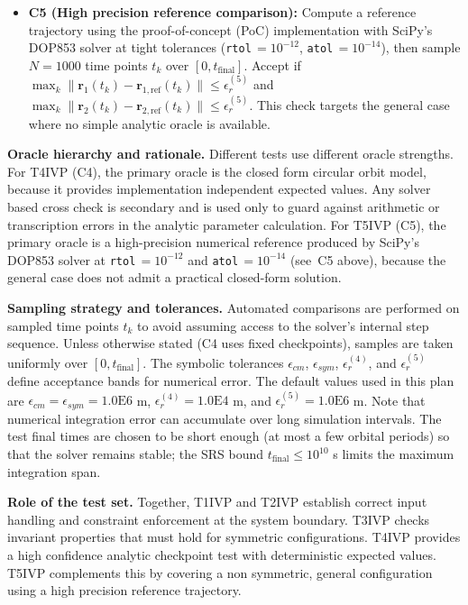 \documentclass[12pt, titlepage]{article}
\begin{document}
\begin{itemize}
  \item \textbf{C5 (High precision reference comparison):} Compute a reference
  trajectory using the proof-of-concept (PoC) implementation with SciPy's
  DOP853 solver at tight tolerances (\texttt{rtol}$\,=10^{-12}$,
  \texttt{atol}$\,=10^{-14}$), then sample $N=1000$ time points $t_k$ over
  $[0, t_{\text{final}}]$. Accept if
  $\max_k \lVert \mathbf{r}_1(t_k)-\mathbf{r}_{1,\text{ref}}(t_k)\rVert \le \epsilon_r^{(5)}$
  and
  $\max_k \lVert \mathbf{r}_2(t_k)-\mathbf{r}_{2,\text{ref}}(t_k)\rVert \le \epsilon_r^{(5)}$.
  This check targets the general case where no simple analytic oracle is
  available.
\end{itemize}

\textbf{Oracle hierarchy and rationale.}
Different tests use different oracle strengths. For T4IVP (C4), the primary
oracle is the closed form circular orbit model, because it provides
implementation independent expected values. Any solver based cross check is
secondary and is used only to guard against arithmetic or transcription errors
in the analytic parameter calculation. For T5IVP (C5), the primary oracle is a
high-precision numerical reference produced by SciPy's DOP853 solver at
\texttt{rtol}$\,=10^{-12}$ and \texttt{atol}$\,=10^{-14}$ (see~C5 above),
because the general case does not admit a practical closed-form solution.

\textbf{Sampling strategy and tolerances.}
Automated comparisons are performed on sampled time points $t_k$ to avoid
assuming access to the solver's internal step sequence. Unless otherwise stated
(C4 uses fixed checkpoints), samples are taken uniformly over
$[0, t_{\text{final}}]$. The symbolic tolerances $\epsilon_{cm}$,
$\epsilon_{sym}$, $\epsilon_r^{(4)}$, and $\epsilon_r^{(5)}$ define acceptance
bands for numerical error.
The default values used in this plan are
$\epsilon_{cm}=\epsilon_{sym}=1.0\mathrm{E}6$ m,
$\epsilon_r^{(4)}=1.0\mathrm{E}4$ m, and
$\epsilon_r^{(5)}=1.0\mathrm{E}6$ m.
Note that numerical integration error can accumulate over long simulation
intervals. The test final times are chosen to be short enough (at most a few
orbital periods) so that the solver remains stable; the SRS bound
$t_{\text{final}} \le 10^{10}$ s limits the maximum integration span.

\textbf{Role of the test set.}
Together, T1IVP and T2IVP establish correct input handling and constraint
enforcement at the system boundary. T3IVP checks invariant properties that must
hold for symmetric configurations. T4IVP provides a high confidence analytic
checkpoint test with deterministic expected values. T5IVP complements this by
covering a non symmetric, general configuration using a high precision
reference trajectory.
\end{document}
